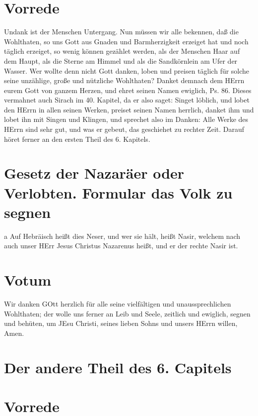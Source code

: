 \section{Vorrede}

Undank ist der Menschen Untergang. Nun müssen wir alle bekennen, daß die Wohlthaten, so uns Gott aus Gnaden und Barmherzigkeit erzeiget hat und noch täglich erzeiget, so wenig können gezählet werden, als der Menschen Haar auf dem Haupt, als die Sterne am Himmel und als die Sandkörnlein am Ufer der Wasser. Wer wollte denn nicht Gott danken, loben und preisen täglich für solche seine unzählige, große und nützliche Wohlthaten? Danket demnach dem HErrn eurem Gott von ganzem Herzen, und ehret seinen Namen ewiglich, Ps. 86. Dieses vermahnet auch Sirach im 40. Kapitel, da er also saget: Singet löblich, und lobet den HErrn in allen seinen Werken, preiset seinen Namen herrlich, danket ihm und lobet ihn mit Singen und Klingen, und sprechet also im Danken: Alle Werke des HErrn sind sehr gut, und was er gebeut, das geschiehet zu rechter Zeit. Darauf höret ferner an den ersten Theil des 6. Kapitels.

\section[Gesetz der Nazaräer oder Verlobten. Formular das Volk]{Gesetz der Nazaräer oder Verlobten. Formular das Volk zu segnen}

a Auf Hebräisch heißt dies Neser, und wer sie hält, heißt Nasir, welchem nach auch unser HErr Jesus Christus Nazarenus heißt, und er der rechte Nasir ist.

\section{Votum}

Wir danken GOtt herzlich für alle seine vielfältigen und unaussprechlichen Wohlthaten; der wolle uns ferner an Leib und Seele, zeitlich und ewiglich, segnen und behüten, um JEsu Christi, seines lieben Sohns und unsers HErrn willen, Amen.

\section{Der andere Theil des 6. Capitels}

\section{Vorrede}

